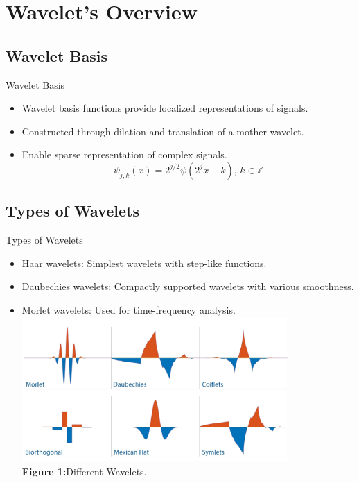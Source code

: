\documentclass{beamer}
\begin{document}
\section{Wavelet's Overview}
\subsection{Wavelet Basis}
\begin{frame}{Wavelet Basis}
    \begin{itemize}
        \item Wavelet basis functions provide localized representations of signals.
        \item Constructed through dilation and translation of a mother wavelet.
        \item Enable sparse representation of complex signals.
        \[
             \psi_{j,k}(x) = 2^{j/2} \psi(2^j x - k), \, k \in \mathbb{Z}
        \]
    \end{itemize}
\end{frame}

\subsection{Types of Wavelets}
\begin{frame}{Types of Wavelets}
    \begin{itemize}
        \item Haar wavelets: Simplest wavelets with step-like functions.
        \item Daubechies wavelets: Compactly supported wavelets with various smoothness.
        \item Morlet wavelets: Used for time-frequency analysis.
        \vfill %
        \centering
        \includegraphics[width=0.8\textwidth]{wavelet.png} %
        \\[0.2cm] %
        {\small \textbf {Figure 1:}Different Wavelets.} %
        
    \end{itemize}
\end{frame}
\end{document}
